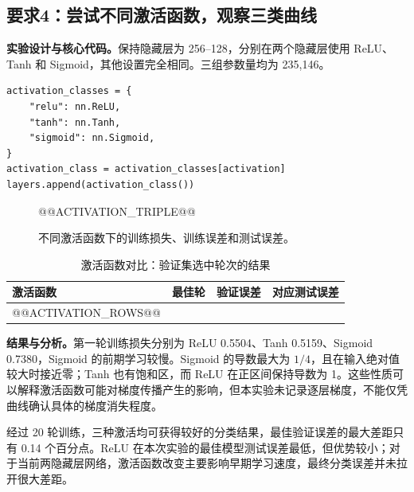 \documentclass[UTF8,11pt,a4paper,fontset=fandol]{ctexart}
\newcommand{\question}[1]{\Needspace{14\baselineskip}\subsection{#1}}
\begin{document}
\question{要求4：尝试不同激活函数，观察三类曲线}
\textbf{实验设计与核心代码。}保持隐藏层为 256--128，分别在两个隐藏层使用 ReLU、Tanh 和 Sigmoid，其他设置完全相同。三组参数量均为 235,146。
\par\noindent\begin{minipage}{\linewidth}
\begin{lstlisting}
activation_classes = {
    "relu": nn.ReLU,
    "tanh": nn.Tanh,
    "sigmoid": nn.Sigmoid,
}
activation_class = activation_classes[activation]
layers.append(activation_class())
\end{lstlisting}
\end{minipage}\par
\begin{figure}[H]\centering
@@ACTIVATION_TRIPLE@@
\caption{不同激活函数下的训练损失、训练误差和测试误差。}\label{fig:activation}
\end{figure}
\begin{table}[H]\centering\small
\caption{激活函数对比：验证集选中轮次的结果}
\begin{tabular}{lrrr}\toprule
激活函数 & 最佳轮 & 验证误差 & 对应测试误差 \\\midrule
@@ACTIVATION_ROWS@@
\bottomrule\end{tabular}
\end{table}
\textbf{结果与分析。}第一轮训练损失分别为 ReLU 0.5504、Tanh 0.5159、Sigmoid 0.7380，Sigmoid 的前期学习较慢。Sigmoid 的导数最大为 $1/4$，且在输入绝对值较大时接近零；Tanh 也有饱和区，而 ReLU 在正区间保持导数为 1。这些性质可以解释激活函数可能对梯度传播产生的影响，但本实验未记录逐层梯度，不能仅凭曲线确认具体的梯度消失程度。

经过 20 轮训练，三种激活均可获得较好的分类结果，最佳验证误差的最大差距只有 0.14 个百分点。ReLU 在本次实验的最佳模型测试误差最低，但优势较小；对于当前两隐藏层网络，激活函数改变主要影响早期学习速度，最终分类误差并未拉开很大差距。
\end{document}
